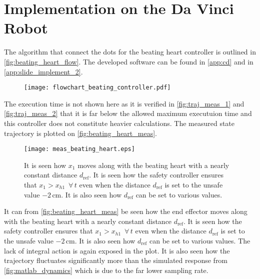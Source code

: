 \section{Implementation on the Da Vinci Robot}
\vspace{-0.2cm}
The algorithm that connect the dots for the beating heart controller is outlined in \autoref{fig:beating_heart_flow}. The developed software can be found in \autoref{app:cd} and in \autoref{app:slide_implement_2}.
\begin{figure}[H]
	\center
		\texttt{[image: flowchart\_beating\_controller.pdf]}
	\caption{}
    \label{fig:beating_heart_flow}
\end{figure}
The execution time is not shown here as it is verified in \autoref{fig:traj_meas_1} and \autoref{fig:traj_meas_2} that it is far below the allowed maximum executuion time and this controller does not constitute heavier calculations. The measured state trajectory is plotted on \autoref{fig:beating_heart_meas}.
\begin{figure}[H]
	\center
		\texttt{[image: meas\_beating\_heart.eps]}
	\caption{It is seen how $x_1$ moves along with the beating heart with a nearly constant distance $d_\text{ref}$. It is seen how the safety controller ensures that $x_1 > x_{h1} \,\,\,\forall \, t$ even when the distance $d_\text{ref}$ is set to the unsafe value $-2\,$cm. It is also seen how $d_\text{ref}$ can be set to various values.}
    \label{fig:beating_heart_meas}
\end{figure}
It can from \autoref{fig:beating_heart_meas} be seen how the end effector moves along with the beating heart with a nearly constant distance $d_\text{ref}$. It is seen how the safety controller ensures that $x_1 > x_{h1} \,\,\,\forall \, t$ even when the distance $d_\text{ref}$ is set to the unsafe value $-2\,$cm. It is also seen how $d_\text{ref}$ can be set to various values. The lack of integral action is again exposed in the plot. It is also seen how the trajectory fluctuates significantly more than the simulated response from \autoref{fig:matlab_dynamics} which is due to the far lower sampling rate.
